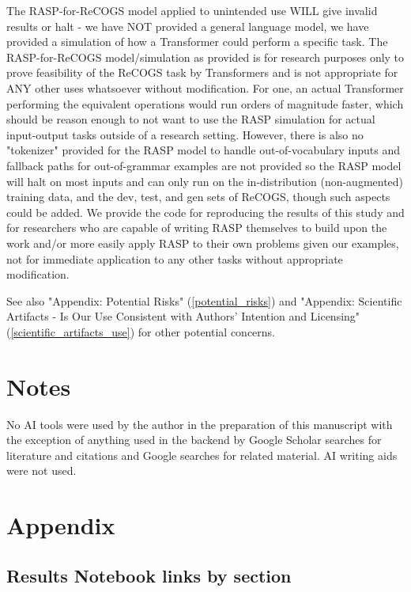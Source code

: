 \documentclass[11pt]{article}
\begin{document}
The RASP-for-ReCOGS model applied to unintended use WILL give invalid results or halt - we have NOT provided a general language model, we have provided a simulation of how a Transformer could perform a specific task.
The RASP-for-ReCOGS model/simulation as provided is for research purposes only to prove feasibility of the ReCOGS task by Transformers and is not appropriate for ANY other uses whatsoever without modification. For one, an actual Transformer performing the equivalent operations would run orders of magnitude faster, which should be reason enough to not want to use the RASP simulation for actual input-output tasks outside of a research setting. However, there is also no "tokenizer" provided for the RASP model to handle out-of-vocabulary inputs and fallback paths for out-of-grammar examples are not provided so the RASP model will halt on most inputs and can only run on the in-distribution (non-augmented) training data, and the dev, test, and gen sets of ReCOGS, though such aspects could be added. We provide the code for reproducing the results of this study and for researchers who are capable of writing RASP themselves to build upon the work and/or more easily apply RASP to their own problems given our examples, not for immediate application to any other tasks without appropriate modification.

See also "Appendix: Potential Risks" (\ref{potential_risks}) and "Appendix: Scientific Artifacts - Is Our Use Consistent with Authors' Intention and Licensing" (\ref{scientific_artifacts_use}) for other potential concerns.



\section*{Notes}
No AI tools were used by the author in the preparation of this manuscript with the exception of anything used in the backend by Google Scholar searches for literature and citations and Google searches for related material. AI writing aids were not used.

\onecolumn
\section{Appendix}

\subsection{Results Notebook links by section}
\label{results_notebook_links_by_section}
\end{document}
